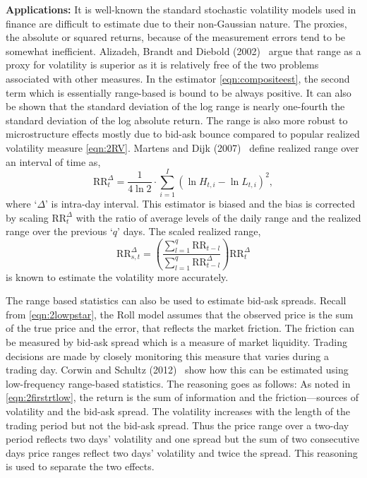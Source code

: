 \noindent\textbf{Applications:} It is well-known the standard stochastic volatility models used in finance are difficult to estimate due to their non-Gaussian nature. The proxies, the absolute or squared returns, because of the measurement errors tend to be somewhat inefficient. Alizadeh, Brandt and Diebold (2002)~\cite{diebold} argue that range as a proxy for volatility is superior as it is relatively free of the two problems associated with other measures. In the estimator \eqref{eqn:compositeest}, the second term which is essentially range-based is bound to be always positive. It can also be shown that the standard deviation of the log range is nearly one-fourth the standard deviation of the log absolute return. The range is also more robust to microstructure effects mostly due to bid-ask bounce compared to popular realized volatility measure \eqref{eqn:2RV}. Martens and Dijk (2007)~\cite{dijk} define realized range over an interval of time as,
	\begin{equation} \label{eqn:rrtdelta}
	\text{RR}_t^\Delta= \dfrac{1}{4\ln 2} \cdot \sum_{i=1}^I (\ln H_{t,i} - \ln L_{t,i})^2,
	\end{equation}
where `$\Delta$' is intra-day interval. This estimator is biased and the bias is corrected by scaling $\text{RR}_t^\Delta$ with the ratio of average levels of the daily range and the realized range over the previous `$q$' days. The scaled realized range,
	\begin{equation} \label{eqn:rrstdelta}
	\text{RR}_{s,t}^\Delta= \left( \dfrac{\sum_{l=1}^q \text{RR}_{t-l}}{\sum_{l=1}^q \text{RR}_{t-l}^\Delta}  \right) \text{RR}_t^\Delta
	\end{equation}
is known to estimate the volatility more accurately. 


The range based statistics can also be used to estimate bid-ask spreads. Recall from \eqref{eqn:2lowpstar}, the Roll model assumes that the observed price is the sum of the true price and the error, that reflects the market friction. The friction can be measured by bid-ask spread which is a measure of market liquidity. Trading decisions are made by closely monitoring this measure that varies during a trading day. Corwin and Schultz (2012)~\cite{schultz12} show how this can be estimated using low-frequency range-based statistics. The reasoning goes as follows: As noted in \eqref{eqn:2firstrtlow}, the return is the sum of information and the friction---sources of volatility and the bid-ask spread. The volatility increases with the length of the trading period but not the bid-ask spread. Thus the price range over a two-day period reflects two days' volatility and one spread but the sum of two consecutive days price ranges reflect two days' volatility and twice the spread. This reasoning is used to separate the two effects.


